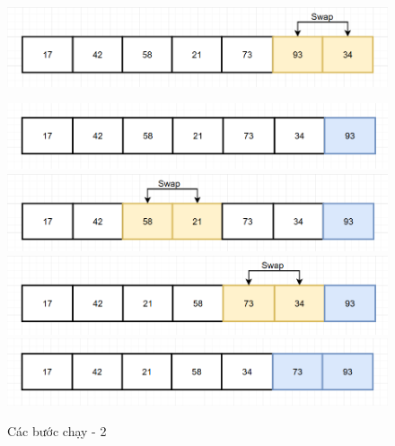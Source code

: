 \begin{figure}[H]
    \centering
    \includegraphics[width=1\linewidth]{img/bubble_sort/6.png}
    
    \vspace{0.5cm}
    \includegraphics[width=1\linewidth]{img/bubble_sort/7.png}
    \vspace{0.5cm}
    \includegraphics[width=1\linewidth]{img/bubble_sort/8.png}
    \vspace{0.5cm}
    \includegraphics[width=1\linewidth]{img/bubble_sort/9.png}
    \vspace{0.5cm}
    \includegraphics[width=1\linewidth]{img/bubble_sort/10.png}
    \caption{Các bước chạy - 2}
    \label{fig:part2}
\end{figure}

